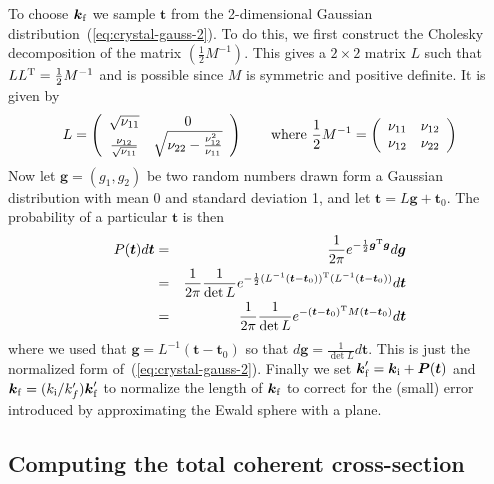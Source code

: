 To choose $\boldsymbol{k}_{\rm f}$ we sample $\boldsymbol{t}$ from the
2-dimensional Gaussian distribution~(\ref{eq:crystal-gauss-2}). To do
this, we first construct the Cholesky decomposition of the matrix
$(\frac{1}{2}M^{-1})$. This gives a $2\times 2$ matrix $L$ such that $L
L^{\rm T} = \frac{1}{2}M^{-1}$ and is possible since $M$ is symmetric
and positive definite. It is given by
$$
  L = \left(
  \begin{array}[c]{cc}
    \sqrt{\nu_{11}} & 0 \\
    \frac{\nu_{12}}{\sqrt{\nu_{11}}} & \sqrt{\nu_{22} - \frac{\nu_{12}^2}{\nu_{11}}}
  \end{array}\right)
\qquad\hbox{where }
  \frac{1}{2}M^{-1} = \left(
  \begin{array}[c]{cc}
    \nu_{11} & \nu_{12} \\
    \nu_{12} & \nu_{22}
  \end{array}\right)
$$
Now let $\boldsymbol{g} = (g_1, g_2)$ be two random numbers drawn form a
Gaussian distribution with mean 0 and standard deviation 1, and let
$\boldsymbol{t} = L\boldsymbol{g} + \boldsymbol{t}_0$. The probability
of a particular $\boldsymbol{t}$ is then
\begin{eqnarray}
  P(\boldsymbol{t})d\boldsymbol{t}
    &=& \frac{1}{2\pi}
      e^{-\frac{1}{2}\boldsymbol{g}^{\rm T}\boldsymbol{g}} d\boldsymbol{g} \\
    &=& \frac{1}{2\pi}\frac{1}{\det L}
      e^{-\frac{1}{2}(L^{-1}(\boldsymbol{t}-\boldsymbol{t}_0))^{\rm T}
          (L^{-1}(\boldsymbol{t}-\boldsymbol{t}_0))} d\boldsymbol{t} \\
    &=& \frac{1}{2\pi}\frac{1}{\det L}
      e^{-(\boldsymbol{t}-\boldsymbol{t}_0)^{\rm T}
          M(\boldsymbol{t}-\boldsymbol{t}_0)} d\boldsymbol{t}
  \label{eq:crystal-gauss-prob-1}
\end{eqnarray}
where we used that
$\boldsymbol{g}=L^{-1}(\boldsymbol{t}-\boldsymbol{t}_0)$ so that
$d\boldsymbol{g} = \frac{1}{\det L}d\boldsymbol{t}$. This is just the
normalized form of~(\ref{eq:crystal-gauss-2}). Finally we set
$\boldsymbol{k}'_{\rm f} = \boldsymbol{k}_{\rm i} +
\boldsymbol{P}(\boldsymbol{t})$ and
$\boldsymbol{k}_{\rm f} = (k_{\rm i}/k'_f)\boldsymbol{k}'_{\rm f}$ to
normalize the length of $\boldsymbol{k}_{\rm f}$ to correct for the
(small) error introduced by approximating the Ewald sphere with a plane.

\subsection{Computing the total coherent cross-section}

